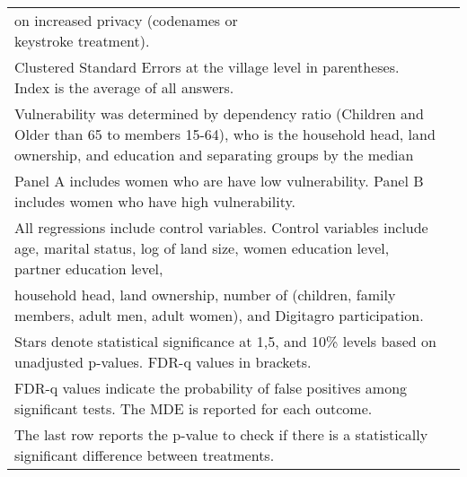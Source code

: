 \begin{tabular}{l*{8}{c}}
{on increased privacy (codenames or keystroke treatment).} \\ \multicolumn{8}{l}{\tiny Clustered Standard Errors at the village level in parentheses. Index is the average of all answers.} \\ \multicolumn{8}{l}{\tiny Vulnerability was determined by dependency ratio (Children and Older than 65 to members 15-64), who is the household head, land ownership, and education and separating groups by the median} \\ \multicolumn{8}{l}{\tiny Panel A includes women who are have low vulnerability. Panel B includes women who have high vulnerability. } \\ \multicolumn{8}{l}{\tiny All regressions include control variables. Control variables include age, marital status, log of land size, women education level, partner education level, } \\ \multicolumn{8}{l}{\tiny household head, land ownership, number of (children, family members, adult men, adult women), and Digitagro participation.} \\  \multicolumn{8}{l}{\tiny Stars denote statistical significance at 1,5, and 10\% levels based on unadjusted p-values. FDR-q values in brackets.} \\ \multicolumn{8}{l}{\tiny FDR-q values indicate the probability of false positives among significant tests. The MDE is reported for each outcome.} \\ \multicolumn{8}{l}{\tiny The last row reports the p-value to check if there is a statistically significant difference between treatments. } \\  \hline\hline \end{tabular}
